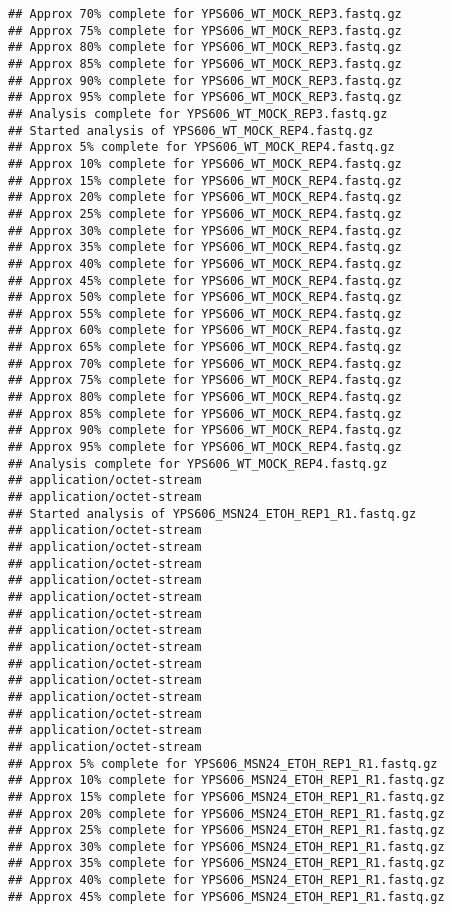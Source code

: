 \documentclass[
]{book}
\begin{document}
\begin{verbatim}
## Approx 70% complete for YPS606_WT_MOCK_REP3.fastq.gz
## Approx 75% complete for YPS606_WT_MOCK_REP3.fastq.gz
## Approx 80% complete for YPS606_WT_MOCK_REP3.fastq.gz
## Approx 85% complete for YPS606_WT_MOCK_REP3.fastq.gz
## Approx 90% complete for YPS606_WT_MOCK_REP3.fastq.gz
## Approx 95% complete for YPS606_WT_MOCK_REP3.fastq.gz
## Analysis complete for YPS606_WT_MOCK_REP3.fastq.gz
## Started analysis of YPS606_WT_MOCK_REP4.fastq.gz
## Approx 5% complete for YPS606_WT_MOCK_REP4.fastq.gz
## Approx 10% complete for YPS606_WT_MOCK_REP4.fastq.gz
## Approx 15% complete for YPS606_WT_MOCK_REP4.fastq.gz
## Approx 20% complete for YPS606_WT_MOCK_REP4.fastq.gz
## Approx 25% complete for YPS606_WT_MOCK_REP4.fastq.gz
## Approx 30% complete for YPS606_WT_MOCK_REP4.fastq.gz
## Approx 35% complete for YPS606_WT_MOCK_REP4.fastq.gz
## Approx 40% complete for YPS606_WT_MOCK_REP4.fastq.gz
## Approx 45% complete for YPS606_WT_MOCK_REP4.fastq.gz
## Approx 50% complete for YPS606_WT_MOCK_REP4.fastq.gz
## Approx 55% complete for YPS606_WT_MOCK_REP4.fastq.gz
## Approx 60% complete for YPS606_WT_MOCK_REP4.fastq.gz
## Approx 65% complete for YPS606_WT_MOCK_REP4.fastq.gz
## Approx 70% complete for YPS606_WT_MOCK_REP4.fastq.gz
## Approx 75% complete for YPS606_WT_MOCK_REP4.fastq.gz
## Approx 80% complete for YPS606_WT_MOCK_REP4.fastq.gz
## Approx 85% complete for YPS606_WT_MOCK_REP4.fastq.gz
## Approx 90% complete for YPS606_WT_MOCK_REP4.fastq.gz
## Approx 95% complete for YPS606_WT_MOCK_REP4.fastq.gz
## Analysis complete for YPS606_WT_MOCK_REP4.fastq.gz
## application/octet-stream
## application/octet-stream
## Started analysis of YPS606_MSN24_ETOH_REP1_R1.fastq.gz
## application/octet-stream
## application/octet-stream
## application/octet-stream
## application/octet-stream
## application/octet-stream
## application/octet-stream
## application/octet-stream
## application/octet-stream
## application/octet-stream
## application/octet-stream
## application/octet-stream
## application/octet-stream
## application/octet-stream
## application/octet-stream
## Approx 5% complete for YPS606_MSN24_ETOH_REP1_R1.fastq.gz
## Approx 10% complete for YPS606_MSN24_ETOH_REP1_R1.fastq.gz
## Approx 15% complete for YPS606_MSN24_ETOH_REP1_R1.fastq.gz
## Approx 20% complete for YPS606_MSN24_ETOH_REP1_R1.fastq.gz
## Approx 25% complete for YPS606_MSN24_ETOH_REP1_R1.fastq.gz
## Approx 30% complete for YPS606_MSN24_ETOH_REP1_R1.fastq.gz
## Approx 35% complete for YPS606_MSN24_ETOH_REP1_R1.fastq.gz
## Approx 40% complete for YPS606_MSN24_ETOH_REP1_R1.fastq.gz
## Approx 45% complete for YPS606_MSN24_ETOH_REP1_R1.fastq.gz

\end{verbatim}
\end{document}
